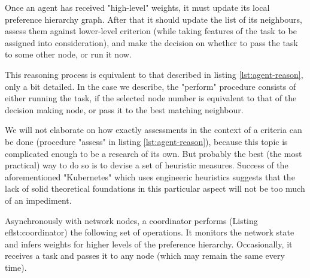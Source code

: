 Once an agent has received "high-level" weights, it must update its local preference hierarchy graph.
After that it should update the list of its neighbours, assess them against lower-level criterion (while taking features of the task to be assigned into consideration), and make the decision on whether to pass the task to some other node, or run it now.

This reasoning process is equivalent to that described in listing \ref{lst:agent-reason}, only a bit detailed.
In the case we describe, the "perform" procedure consists of either running the task, if the selected node number is equivalent to that of the decision making node, or pass it to the best matching neighbour.

We will not elaborate on how exactly assessments in the context of a criteria can be done (procedure "assess" in listing \ref{lst:agent-reason}), because this topic is complicated enough to be a research of its own.
But probably the best (the most practical) way to do so is to devise a set of heuristic measures.
Success of the aforementioned "Kubernetes" which uses engineeric heuristics suggests that the lack of solid theoretical foundations in this particular aspect will not be too much of an impediment.

Asynchronously with network nodes, a coordinator performs (Listing ef{lst:coordinator}) the following set of operations.
It monitors the network state and infers weights for higher levels of the preference hierarchy.
Occasionally, it receives a task and passes it to any node (which may remain the same every time).
